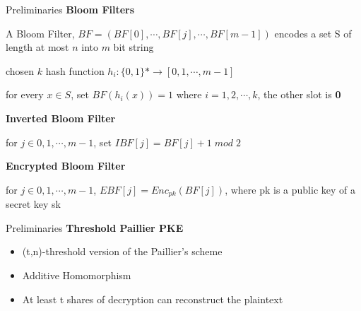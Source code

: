 \begin{frame}{Preliminaries}
    \textbf{Bloom Filters}

    \vspace{0.5cm}

    A Bloom Filter, $BF = (BF[0],\cdots, BF[ j ], \cdots , BF[m-1])$ encodes a set S of length at most $n$ into $m$ bit
    string

    chosen $k$ hash function $h_i: \{0,1\}* \rightarrow [0,1,\cdots,m-1 ]$

    for every $x \in S$, set $BF(h_i(x))=1$ where $i = 1,2,\cdots,k$, the other slot is \textbf{0}
    
    \vspace{0.5cm}

    \textbf{Inverted Bloom Filter}

    \vspace{0.5cm}

    for $j \in 0,1,\cdots,m-1 $, set $IBF[j] = BF[j] +1 \; mod \; 2$
    \vspace{0.5cm}

    \textbf{Encrypted Bloom Filter}

    \vspace{0.5cm}

    for $j \in 0,1,\cdots,m-1 $,
    $EBF [ j] = Enc_{pk}(BF [ j ])$, where pk is a public key
of a secret key sk

\end{frame}

\begin{frame}{Preliminaries}
    \textbf{Threshold Paillier PKE}

    \begin{itemize}
        \item (t,n)-threshold version of the Paillier's scheme
        \item Additive Homomorphism
        \item At least t shares of decryption can reconstruct the plaintext
    \end{itemize}


\end{frame}

